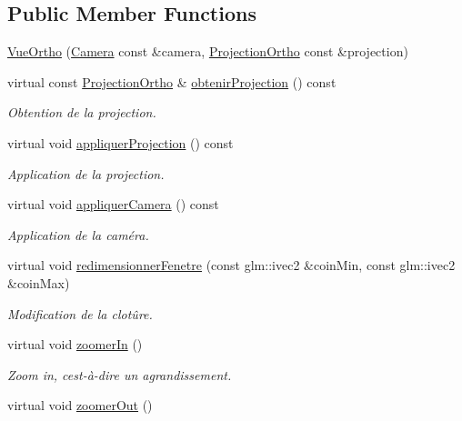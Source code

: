 \subsection*{Public Member Functions}
\begin{DoxyCompactItemize}
\item 
\hyperlink{classvue_1_1_vue_ortho_a6bfb00557ce06ac18b021650a15ded67}{Vue\+Ortho} (\hyperlink{classvue_1_1_camera}{Camera} const \&camera, \hyperlink{classvue_1_1_projection_ortho}{Projection\+Ortho} const \&projection)
\item 
virtual const \hyperlink{classvue_1_1_projection_ortho}{Projection\+Ortho} \& \hyperlink{classvue_1_1_vue_ortho_a732dee29813a40b6404eb7ed06287a8e}{obtenir\+Projection} () const 
\begin{DoxyCompactList}\small\item\em Obtention de la projection. \end{DoxyCompactList}\item 
virtual void \hyperlink{classvue_1_1_vue_ortho_a188cf5eb7c0a24536d1ab73b18f93f63}{appliquer\+Projection} () const 
\begin{DoxyCompactList}\small\item\em Application de la projection. \end{DoxyCompactList}\item 
virtual void \hyperlink{classvue_1_1_vue_ortho_aff568cb715637b0407076279fac672ff}{appliquer\+Camera} () const 
\begin{DoxyCompactList}\small\item\em Application de la caméra. \end{DoxyCompactList}\item 
virtual void \hyperlink{classvue_1_1_vue_ortho_ad2e8ccf82efadbc00c2900eb5e549d6f}{redimensionner\+Fenetre} (const glm\+::ivec2 \&coin\+Min, const glm\+::ivec2 \&coin\+Max)
\begin{DoxyCompactList}\small\item\em Modification de la clotûre. \end{DoxyCompactList}\item 
virtual void \hyperlink{classvue_1_1_vue_ortho_a9d43decb227db8bf71905227904b6953}{zoomer\+In} ()
\begin{DoxyCompactList}\small\item\em Zoom in, c\textquotesingle{}est-\/à-\/dire un agrandissement. \end{DoxyCompactList}\item 
virtual void \hyperlink{classvue_1_1_vue_ortho_a16855ff46992fd6ff9e306058f90924a}{zoomer\+Out} ()

\end{DoxyCompactItemize}
